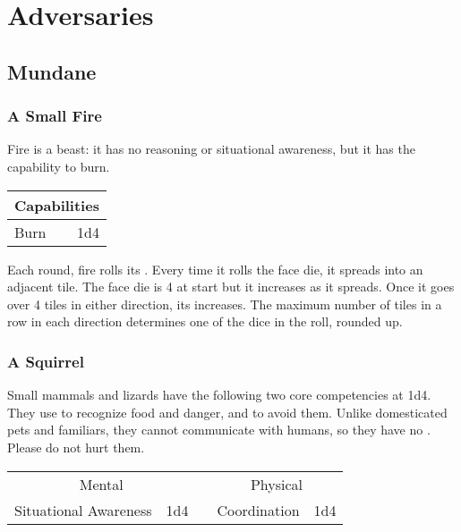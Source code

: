 \documentclass{LegrandOrangeTufteBook}
\begin{document}
\chapterspaceabove{6.75cm}
\chapterspacebelow{11.25cm}


\chapter*{Adversaries}

\section*{Mundane}

\subsection*{A Small Fire}

Fire is a beast: it has no reasoning or situational awareness, but it has the capability to burn.
\begin{center}
	\begin{tabular}{lr|}
		\multicolumn{2}{c}{Capabilities}\\
		\hline
		Burn & 1d4 \\
	\end{tabular}
\end{center}

Each round, fire rolls its . Every time it rolls the face die,
it spreads into an adjacent tile. The face die is 4 at start but it increases as it spreads.
Once it goes over 4 tiles in either direction, its  increases.
The maximum number of tiles in a row in each direction determines one of the dice in the  roll, rounded up.
\\



\subsection*{A Squirrel}
Small mammals and lizards have the following two core competencies at 1d4.
They use  to recognize food and danger,
and  to avoid them.
Unlike domesticated pets and familiars, they cannot communicate with
humans, so they have no .
Please do not hurt them.\\
\begin{center}
	\begin{tabular}{lr|clr|}
		\multicolumn{2}{c}{Mental}	&&	\multicolumn{2}{c}{Physical} \\
		\cline{1-2} \cline{4-5}
		Situational Awareness & 1d4				&& 	Coordination & 1d4 \\
	\end{tabular}
\end{center}
\end{document}
